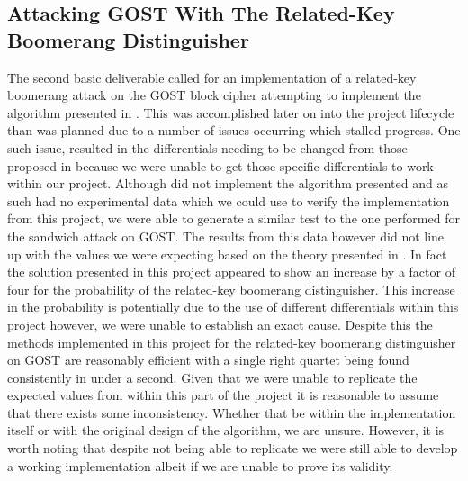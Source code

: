 \documentclass[10pt,journal,compsoc]{IEEEtran}
\begin{document}
\subsection{Attacking GOST With The Related-Key Boomerang Distinguisher}
The second basic deliverable called for an implementation of a related-key boomerang attack on the GOST block cipher attempting to implement the algorithm presented in \cite{cryptoeprint:2010/111}. This was accomplished later on into the project lifecycle than was planned due to a number of issues occurring which stalled progress. One such issue, resulted in the differentials needing to be changed from those proposed in \cite{cryptoeprint:2010/111} because we were unable to get those specific differentials to work within our project. Although \cite{cryptoeprint:2010/111} did not implement the algorithm presented and as such had no experimental data which we could use to verify the implementation from this project, we were able to generate a similar test to the one performed for the sandwich attack on GOST. The results from this data however did not line up with the values we were expecting based on the theory presented in \cite{cryptoeprint:2010/111}. In fact the solution presented in this project appeared to show an increase by a factor of four for the probability of the related-key boomerang distinguisher. This increase in the probability is potentially due to the use of different differentials within this project however, we were unable to establish an exact cause. Despite this the methods implemented in this project for the related-key boomerang distinguisher on GOST are reasonably efficient with a single right quartet being found consistently in under a second. Given that we were unable to replicate the expected values from \cite{cryptoeprint:2010/111} within this part of the project it is reasonable to assume that there exists some inconsistency. Whether that be within the implementation itself or with the original design of the algorithm, we are unsure. However, it is worth noting that despite not being able to replicate \cite{cryptoeprint:2010/111} we were still able to develop a working implementation albeit if we are unable to prove its validity.
\end{document}
